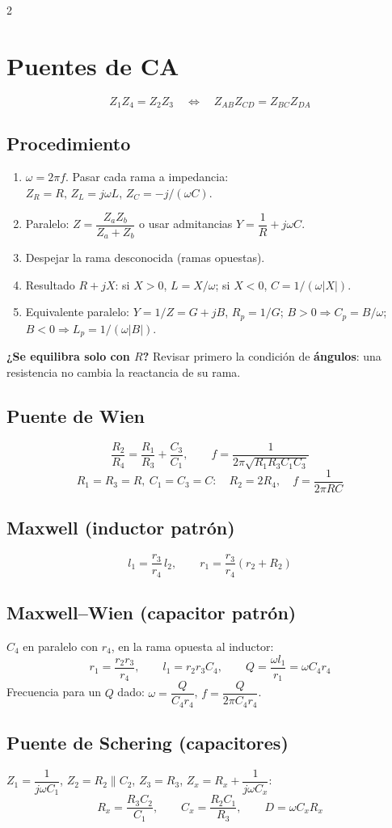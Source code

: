 \documentclass{article}
\begin{document}
\begin{multicols}{2}
\section{Puentes de CA}
\[
Z_1 Z_4 = Z_2 Z_3 \quad\Longleftrightarrow\quad Z_{AB}Z_{CD} = Z_{BC}Z_{DA}
\]

\subsection{Procedimiento}
\begin{enumerate}
\item $\omega = 2\pi f$. Pasar cada rama a impedancia:\\
$Z_R = R$, $Z_L = j\omega L$, $Z_C = -j/(\omega C)$.
\item Paralelo: $Z = \dfrac{Z_aZ_b}{Z_a+Z_b}$ o usar admitancias $Y = \dfrac{1}{R} + j\omega C$.
\item Despejar la rama desconocida (ramas opuestas).
\item Resultado $R + jX$: si $X>0$, $L = X/\omega$; si $X<0$, $C = 1/(\omega|X|)$.
\item Equivalente paralelo: $Y = 1/Z = G + jB$, $R_p = 1/G$; $B>0 \Rightarrow C_p = B/\omega$; $B<0 \Rightarrow L_p = 1/(\omega|B|)$.
\end{enumerate}
\textbf{¿Se equilibra solo con $R$?} Revisar primero la condición de \textbf{ángulos}: una resistencia no cambia la reactancia de su rama.

\subsection{Puente de Wien}
\[
\frac{R_2}{R_4} = \frac{R_1}{R_3} + \frac{C_3}{C_1},\qquad f = \frac{1}{2\pi\sqrt{R_1R_3C_1C_3}}
\]
\[
R_1 = R_3 = R,\ C_1 = C_3 = C:\quad R_2 = 2R_4,\quad f = \frac{1}{2\pi RC}
\]

\subsection{Maxwell (inductor patrón)}
\[
l_1 = \frac{r_3}{r_4}\,l_2,\qquad r_1 = \frac{r_3}{r_4}(r_2 + R_2)
\]
\subsection{Maxwell--Wien (capacitor patrón)}
$C_4$ en paralelo con $r_4$, en la rama opuesta al inductor:
\[
r_1 = \frac{r_2 r_3}{r_4},\qquad l_1 = r_2 r_3 C_4,\qquad Q = \frac{\omega l_1}{r_1} = \omega C_4 r_4
\]
Frecuencia para un $Q$ dado: $\omega = \dfrac{Q}{C_4 r_4}$, $f = \dfrac{Q}{2\pi C_4 r_4}$.

\subsection{Puente de Schering (capacitores)}
$Z_1 = \dfrac{1}{j\omega C_1}$, $Z_2 = R_2\|C_2$, $Z_3 = R_3$, $Z_x = R_x + \dfrac{1}{j\omega C_x}$:
\[
R_x = \frac{R_3 C_2}{C_1},\qquad C_x = \frac{R_2 C_1}{R_3},\qquad D = \omega C_x R_x
\]
\end{multicols}
\end{document}

